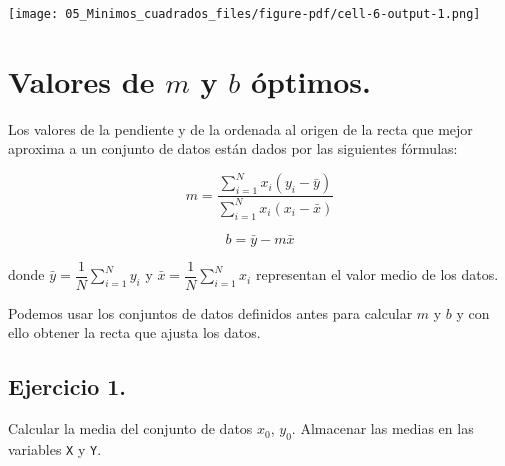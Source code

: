 \documentclass[
  letterpaper,
  DIV=11,
  numbers=noendperiod]{scrreprt}
\begin{document}
\texttt{[image: 05\_Minimos\_cuadrados\_files/figure-pdf/cell-6-output-1.png]}


\chapter{\texorpdfstring{Valores de \(m\) y \(b\)
óptimos.}{Valores de m y b óptimos.}}\label{valores-de-m-y-b-uxf3ptimos.}

Los valores de la pendiente y de la ordenada al origen de la recta que
mejor aproxima a un conjunto de datos están dados por las siguientes
fórmulas:

\[
m = \dfrac{\sum_{i=1}^{N} x_i(y_i - \bar{y})}{\sum_{i=1}^{N} x_i(x_i - \bar{x})} \tag{1}
\]

\[
b = \bar{y} - m \bar{x} \tag{2}
\]

donde \(\bar{y} = \dfrac{1}{N}\sum_{i=1}^{N} y_i\) y
\(\bar{x} = \dfrac{1}{N}\sum_{i=1}^{N} x_i\) representan el valor medio
de los datos.

Podemos usar los conjuntos de datos definidos antes para calcular \(m\)
y \(b\) y con ello obtener la recta que ajusta los datos.

\section{\texorpdfstring{\textbf{Ejercicio
1.}}{Ejercicio 1.}}\label{ejercicio-1.}

Calcular la media del conjunto de datos \(x_0\), \(y_0\). Almacenar las
medias en las variables \texttt{X} y \texttt{Y}.
\end{document}
